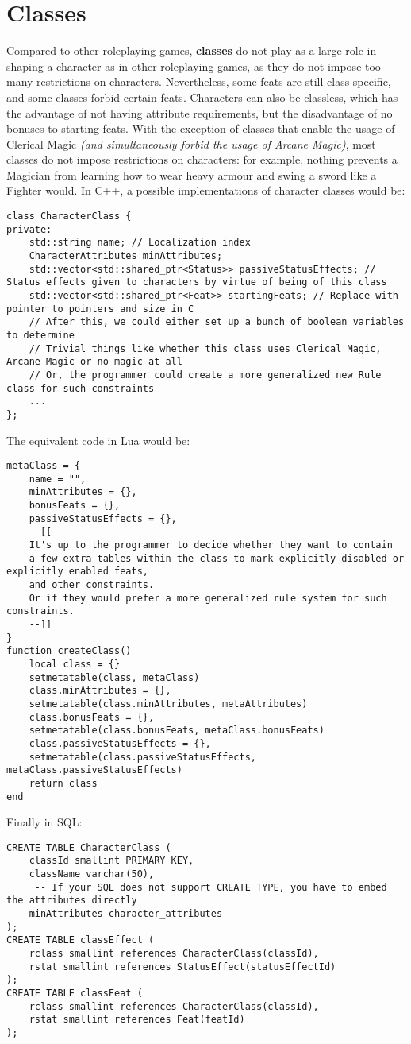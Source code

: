 \documentclass[openany,11pt,a4paper]{book}
\begin{document}
\section{Classes}
Compared to other roleplaying games, \textbf{classes} do not play as a large role in shaping a character as in other roleplaying games, as they do not impose too many restrictions on characters. Nevertheless, some feats are still class-specific, and some classes forbid certain feats. Characters can also be classless, which has the advantage of not having attribute requirements, but the disadvantage of no bonuses to starting feats.\newline
With the exception of classes that enable the usage of Clerical Magic \textit{(and simultaneously forbid the usage of Arcane Magic)}, most classes do not impose restrictions on characters: for example, nothing prevents a Magician from learning how to wear heavy armour and swing a sword like a Fighter would.\newline
In C++, a possible implementations of character classes would be:
\begin{lstlisting}[style=CPPStyle]
class CharacterClass {
private:
	std::string name; // Localization index
	CharacterAttributes minAttributes;
	std::vector<std::shared_ptr<Status>> passiveStatusEffects; // Status effects given to characters by virtue of being of this class
	std::vector<std::shared_ptr<Feat>> startingFeats; // Replace with pointer to pointers and size in C
	// After this, we could either set up a bunch of boolean variables to determine
	// Trivial things like whether this class uses Clerical Magic, Arcane Magic or no magic at all 
	// Or, the programmer could create a more generalized new Rule class for such constraints
	...
};
\end{lstlisting}
The equivalent code in Lua would be:
\begin{lstlisting}[style=LuaStyle]
metaClass = {
	name = "",
	minAttributes = {},
	bonusFeats = {},
	passiveStatusEffects = {},
	--[[
	It's up to the programmer to decide whether they want to contain
	a few extra tables within the class to mark explicitly disabled or explicitly enabled feats,
	and other constraints.
	Or if they would prefer a more generalized rule system for such constraints.
	--]]
}
function createClass()
	local class = {}
	setmetatable(class, metaClass)
	class.minAttributes = {},
	setmetatable(class.minAttributes, metaAttributes)
	class.bonusFeats = {},
	setmetatable(class.bonusFeats, metaClass.bonusFeats)
	class.passiveStatusEffects = {},
	setmetatable(class.passiveStatusEffects, metaClass.passiveStatusEffects)
	return class
end
\end{lstlisting}
Finally in SQL:
\begin{lstlisting}[style=SqlStyle]
CREATE TABLE CharacterClass (
	classId smallint PRIMARY KEY,
	className varchar(50),
	 -- If your SQL does not support CREATE TYPE, you have to embed the attributes directly
	minAttributes character_attributes
);
CREATE TABLE classEffect (
	rclass smallint references CharacterClass(classId),
	rstat smallint references StatusEffect(statusEffectId)
);
CREATE TABLE classFeat (
	rclass smallint references CharacterClass(classId),
	rstat smallint references Feat(featId)
);
\end{lstlisting}
\end{document}
